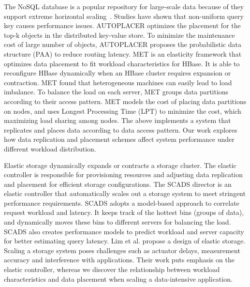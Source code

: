 The NoSQL database is a popular repository for large-scale data
because of they support extreme horizontal
scaling~\cite{Lakshman2010,Chang2008,hbase,mongodb}.
Studies have shown that non-uniform query key
causes performance issues.
AUTOPLACER \cite{Rodrigues2013} optimizes the placement
for the top-k objects in the distributed key-value store.
To minimize the maintenance cost of large number of objects,
AUTOPLACER proposes the probabilistic data structure (PAA)
to reduce routing latency.
MET \cite{Cruz2013} is an elasticity framework that 
optimizes data placement to fit workload characteristics for HBase.
It is able to reconfigure HBase dynamically when an HBase cluster
requires expansion or contraction.
MET found that heterogeneous machines can easily lead to load imbalance.
To balance the load on each server, MET groups data partitions
according to their access pattern.
MET models the cost of placing data partitions on nodes, and
uses Longest Processing Time (LPT) to minimize the cost,
which maximizing load sharing among nodes.
The above implements a system that replicates and places data according to
data access pattern.
Our work explores how data replication and placement schemes
affect system performance under different workload distribution.



Elastic storage dynamically expands or contracts a storage cluster.
The elastic controller is responsible for
provisioning resources and adjusting data replication and placement
for efficient storage configurations.
The SCADS director \cite{Trushkowsky2011} is an elastic controller
that automatically scales out a storage system to meet stringent
performance requirements. 
SCADS adopts a model-based approach to correlate request workload and
latency. 
It keeps track of the hottest bins (groups of data), and
dynamically moves these bins to different servers for balancing the load.
SCADS also creates performance models to predict workload and server capacity
for better estimating query latency.
Lim et al. propose a design of elastic storage\cite{Lim2010}.
Scaling a storage system poses challenges such as actuator delays,
measurement accuracy and interference with applications.
Their work puts emphasis on the elastic controller, whereas
we discover the relationship between
workload characteristics and data placement
when scaling a data-intensive application.


